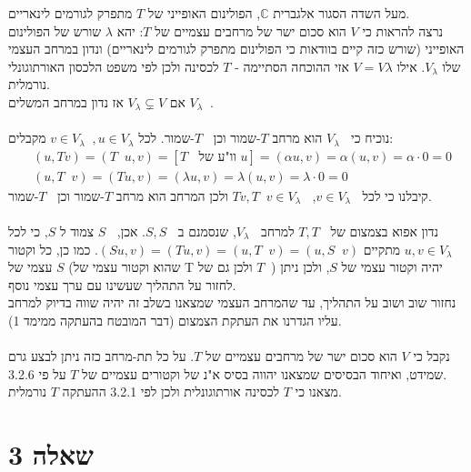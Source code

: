 \documentclass{article}
\def\complex{\mathbb{C}}
\DeclareMathOperator{\adj}{^\ast}
\DeclareMathOperator{\perc}{^\perp}
\begin{document}
מעל השדה הסגור אלגברית $\complex$, הפולינום האופייני של $T$ מתפרק לגורמים לינאריים. \\
נרצה להראות כי $V$ הוא סכום ישר של מרחבים עצמיים של $T$: יהא $\lambda$ שורש של הפולינום האופייני (שורש כזה קיים בוודאות כי הפולינום מתפרק לגורמים לינאריים) ונדון במרחב העצמי שלו $V_\lambda$. אילו $V=V\lambda$ אזי ההוכחה הסתיימה - $T$ לכסינה ולכן לפי משפט הלכסון האורתוגונלי נורמלית. \\
אם $V_\lambda \subsetneq V$ אז נדון במרחב המשלים $V_\lambda\perc$. \\\\
נוכיח כי $V_\lambda\perc$ הוא מרחב $T$-שמור וכן $T\adj$-שמור.
לכל $v\in V_\lambda\perc, u\in V_\lambda$ מקבלים:
\begin{align*}
     & (u, Tv)        =(T\adj u, v)=[T\adj \text{ וו"ע של } u]=(\alpha u, v)=\alpha(u,v)=\alpha\cdot0=0 \\
     & (u, T \adj v)  = (Tu, v)=(\lambda u, v)=\lambda(u,v)=\lambda\cdot 0 = 0
\end{align*}
קיבלנו כי לכל $v\in V_\lambda\perc$, $Tv, T\adj v \in V_\lambda\perc$ ולכן המרחב הוא מרחב $T$-שמור וכן $T\adj$-שמור.\\\\
נדון אפוא בצמצום של $T, T\adj$ למרחב $V_\lambda\perc$, שנסמנם ב $S, S\adj$. אכן, $S\adj$ צמוד ל $S$, כי לכל $u,v\in V_\lambda\perc$ מתקיים $(Su,v)=(Tu,v)=(u, T\adj v)=(u, S\adj v)$. כמו כן, כל וקטור עצמי של $S$ (שהוא וקטור עצמי של T ולכן גם של $T\adj$) יהיה וקטור עצמי של $S$, ולכן ניתן לחזור על התהליך שעשינו עם ערך עצמי נוסף. \\
נחזור שוב ושוב על התהליך, עד שהמרחב העצמי שמצאנו בשלב זה יהיה שווה בדיוק למרחב עליו הגדרנו את העתקת הצמצום (דבר המובטח בהעתקה ממימד 1).\\\\
נקבל כי $V$ הוא סכום ישר של מרחבים עצמיים של $T$. על כל תת-מרחב כזה ניתן לבצע גרם שמידט, ואיחוד הבסיסים שמצאנו יהווה בסיס א"נ של וקטורים עצמיים של $T$ על פי 3.2.6. \\
מצאנו כי $T$ לכסינה אורתוגונלית ולכן לפי 3.2.1 ההעתקה $T$ נורמלית.

\pagebreak

\section*{שאלה 3}
\end{document}

